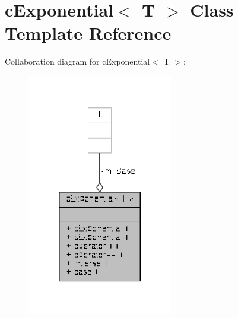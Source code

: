 \hypertarget{classcExponential}{\section{c\-Exponential$<$ T $>$ Class Template Reference}
\label{classcExponential}
}


Collaboration diagram for c\-Exponential$<$ T $>$\-:
\nopagebreak
\begin{figure}[H]
\begin{center}
\leavevmode
\includegraphics[width=180pt]{classcExponential__coll__graph}
\end{center}
\end{figure}
